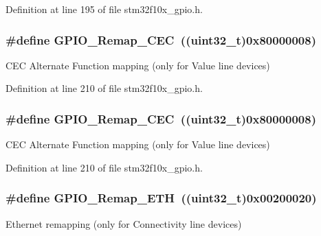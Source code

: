 Definition at line 195 of file stm32f10x\+\_\+gpio.\+h.

\subsubsection[{\texorpdfstring{G\+P\+I\+O\+\_\+\+Remap\+\_\+\+C\+EC}{GPIO_Remap_CEC}}]{\setlength{\rightskip}{0pt plus 5cm}\#define G\+P\+I\+O\+\_\+\+Remap\+\_\+\+C\+EC~(({\bf uint32\+\_\+t})0x80000008)}\hypertarget{group___g_p_i_o___remap__define_gac5961690908d4a0737e82b5a7d271b9b}{}\label{group___g_p_i_o___remap__define_gac5961690908d4a0737e82b5a7d271b9b}
C\+EC Alternate Function mapping (only for Value line devices) 

Definition at line 210 of file stm32f10x\+\_\+gpio.\+h.

\subsubsection[{\texorpdfstring{G\+P\+I\+O\+\_\+\+Remap\+\_\+\+C\+EC}{GPIO_Remap_CEC}}]{\setlength{\rightskip}{0pt plus 5cm}\#define G\+P\+I\+O\+\_\+\+Remap\+\_\+\+C\+EC~(({\bf uint32\+\_\+t})0x80000008)}\hypertarget{group___g_p_i_o___remap__define_gac5961690908d4a0737e82b5a7d271b9b}{}\label{group___g_p_i_o___remap__define_gac5961690908d4a0737e82b5a7d271b9b}
C\+EC Alternate Function mapping (only for Value line devices) 

Definition at line 210 of file stm32f10x\+\_\+gpio.\+h.

\subsubsection[{\texorpdfstring{G\+P\+I\+O\+\_\+\+Remap\+\_\+\+E\+TH}{GPIO_Remap_ETH}}]{\setlength{\rightskip}{0pt plus 5cm}\#define G\+P\+I\+O\+\_\+\+Remap\+\_\+\+E\+TH~(({\bf uint32\+\_\+t})0x00200020)}\hypertarget{group___g_p_i_o___remap__define_gaf578688bb4d1a17fb3a103946e7c2eb7}{}\label{group___g_p_i_o___remap__define_gaf578688bb4d1a17fb3a103946e7c2eb7}
Ethernet remapping (only for Connectivity line devices) 

